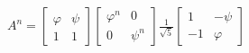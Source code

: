 \documentclass[preview]{standalone}
\begin{document}
\begin{align*}
A^n = \begin{bmatrix} \varphi & \psi \\ 1 & 1 \end{bmatrix}\begin{bmatrix} \varphi^n & 0 \\ 0 & \psi^n \end{bmatrix}\frac{1}{\sqrt{5}}\begin{bmatrix} 1 & -\psi \\ -1 & \varphi \end{bmatrix}
\end{align*}
\end{document}
